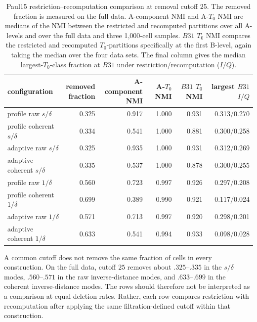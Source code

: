 \documentclass[a4paper,11pt]{article}
\theoremstyle{definition}
\theoremstyle{remark}
\begin{document}
\begin{table}[!ht]
\centering
\small
\caption{Paul15 restriction--recomputation comparison at removal cutoff 25. The removed fraction is measured on the full data. A-component NMI and A-$T_0$ NMI are medians of the NMI between the restricted and recomputed partitions over all A-levels and over the full data and three 1,000-cell samples. $B31$ $T_0$ NMI compares the restricted and recomputed $T_0$-partitions specifically at the first B-level, again taking the median over the four data sets. The final column gives the median largest-$T_0$-class fraction at $B31$ under restriction/recomputation ($I/Q$).}
\label{tab:paul15-removal-modes}
\setlength{\tabcolsep}{3.2pt}
\begin{tabular}{@{}lrrrrr@{}}
\toprule
configuration & \shortstack{removed\\fraction} & \shortstack{A-component\\NMI} & \shortstack{A-$T_0$\\NMI} & \shortstack{$B31$ $T_0$\\NMI} & \shortstack{largest $B31$\\$I/Q$} \\
\midrule
profile raw $s/\delta$ & 0.325 & 0.917 & 1.000 & 0.931 & 0.313/0.270 \\
profile coherent $s/\delta$ & 0.334 & 0.541 & 1.000 & 0.881 & 0.300/0.258 \\
adaptive raw $s/\delta$ & 0.325 & 0.935 & 1.000 & 0.931 & 0.312/0.269 \\
adaptive coherent $s/\delta$ & 0.335 & 0.537 & 1.000 & 0.878 & 0.300/0.255 \\
profile raw $1/\delta$ & 0.560 & 0.723 & 0.997 & 0.926 & 0.297/0.208 \\
profile coherent $1/\delta$ & 0.699 & 0.389 & 0.990 & 0.921 & 0.117/0.024 \\
adaptive raw $1/\delta$ & 0.571 & 0.713 & 0.997 & 0.920 & 0.298/0.201 \\
adaptive coherent $1/\delta$ & 0.633 & 0.541 & 0.994 & 0.933 & 0.098/0.028 \\
\bottomrule
\end{tabular}
\end{table}

A common cutoff does not remove the same fraction of cells in every construction. On the full data, cutoff $25$ removes about $.325$–$.335$ in the $s/\delta$ modes, $.560$–$.571$ in the raw inverse-distance modes, and $.633$–$.699$ in the coherent inverse-distance modes. The rows should therefore not be interpreted as a comparison at equal deletion rates. Rather, each row compares restriction with recomputation after applying the same filtration-defined cutoff within that construction.
\end{document}
